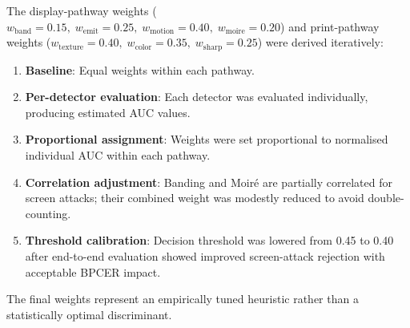 \documentclass[11pt,a4paper]{article}
\begin{document}
The display-pathway weights
($w_\text{band}=0.15,\;w_\text{emit}=0.25,\;w_\text{motion}=0.40,\;w_\text{moire}=0.20$)
and print-pathway weights
($w_\text{texture}=0.40,\;w_\text{color}=0.35,\;w_\text{sharp}=0.25$)
were derived iteratively:

\begin{enumerate}[label=\arabic*.]
  \item \textbf{Baseline}: Equal weights within each pathway.
  \item \textbf{Per-detector evaluation}: Each detector was evaluated individually,
    producing estimated AUC values.
  \item \textbf{Proportional assignment}: Weights were set proportional to
    normalised individual AUC within each pathway.
  \item \textbf{Correlation adjustment}: Banding and Moir\'{e} are partially
    correlated for screen attacks; their combined weight was modestly reduced
    to avoid double-counting.
  \item \textbf{Threshold calibration}: Decision threshold was lowered from 0.45
    to 0.40 after end-to-end evaluation showed improved screen-attack rejection
    with acceptable BPCER impact.
\end{enumerate}

The final weights represent an empirically tuned heuristic rather than a
statistically optimal discriminant.
\end{document}
